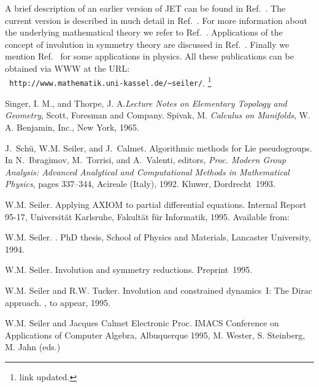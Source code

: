 \documentclass[12pt,a4paper]{article}
\begin{document}
A brief description of an earlier version of {\small JET} can be found in
Ref.~\cite{wms:aci}. The current version is described in much detail in
Ref.~\cite{wms:axiom}. For more information about the underlying mathematical
theory we refer to Ref.~\cite{wms:diss}. Applications of the concept of
involution in symmetry theory are discussed in Ref.~\cite{wms:mcm}. Finally
we mention Ref.~\cite{wms:con1} for some applications in physics. All these
publications can be obtained via {\small WWW} at the {\small URL}:\\
{\tt
http://www.mathematik.uni-kassel.de/\textasciitilde  seiler/}. 
\footnote{link updated.}
%
%
\begin{thebibliography}{1}
%
 Singer, I. M., and Thorpe, J. A.{\em Lecture Notes on 
  Elementary Topology and Geometry}, Scott, Foresman and Company. 
 Spivak, M. {\em Calculus on Manifolds}, W. A. Benjamin, 
  Inc., New York, 1965. 

J.~Sch\"u, W.M. Seiler, and J.~Calmet.
\newblock Algorithmic methods for {L}ie pseudogroups.
\newblock In N.~Ibragimov, M.~Torrisi, and A.~Valenti, editors, {\em Proc.
  Modern Group Analysis: Advanced Analytical and Computational Methods in
  Mathematical Physics}, pages 337--344, Acireale (Italy), 1992. Kluwer,
  Dordrecht~1993.

W.M. Seiler.
\newblock Applying {AXIOM} to partial differential equations.
\newblock Internal Report 95-17, Universit\"at Karlsruhe, Fakult\"at f\"ur
  Informatik, 1995. Available from:

W.M. Seiler.
.
\newblock PhD thesis, School of Physics and Materials, Lancaster University,
  1994.

W.M. Seiler.
\newblock Involution and symmetry reductions.
\newblock Preprint~1995.

W.M. Seiler and R.W. Tucker.
\newblock Involution and constrained dynamics~{I}: The {D}irac approach.
, to appear, 1995.

W.M. Seiler and  Jacques Calmet
Electronic Proc. IMACS Conference on Applications of Computer Algebra, 
Albuquerque 1995, M. Wester, S. Steinberg, M. Jahn (eds.)
\end{thebibliography}
%
\end{document}
